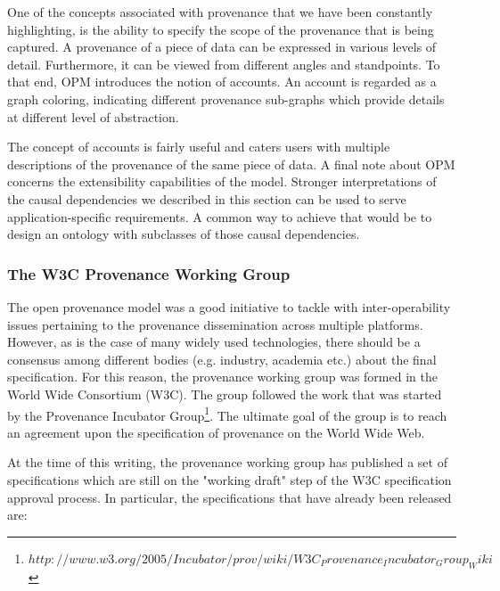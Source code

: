 One of the concepts associated with provenance that we have been constantly highlighting, is the ability to specify the scope of the provenance that is being captured.  A provenance of a piece of data can be expressed in various levels of detail. Furthermore, it can be viewed from different angles and standpoints. To that end, OPM introduces the notion of accounts. An account is regarded as a graph coloring, indicating different provenance sub-graphs which provide details at different level of abstraction.


The concept of accounts is fairly useful and caters users with multiple descriptions of the provenance of the same piece of data.
A final note about OPM concerns the extensibility capabilities of the model. Stronger interpretations of the causal dependencies we described in this section can be used to serve application-specific requirements. A common way to achieve that would be to design an ontology with subclasses of those causal dependencies.


\subsubsection{The W3C Provenance Working Group}
The open provenance model was a good initiative to tackle with inter-operability issues pertaining to the provenance dissemination across multiple platforms. However, as is the case of many widely used technologies, there should be a consensus among different bodies (e.g. industry, academia etc.) about the final specification. For this reason, the provenance working group was formed in the World Wide Consortium (W3C). The group followed the work that was started by the Provenance Incubator Group\footnote{$http://www.w3.org/2005/Incubator/prov/wiki/W3C_Provenance_Incubator_Group_Wiki$}. The ultimate goal of the group is to reach an agreement upon the specification of provenance on the World Wide Web.

At the time of this writing, the provenance working group has published a set of specifications which are still on the "working draft" step of the W3C specification approval process. In particular, the specifications that have already been released are:

